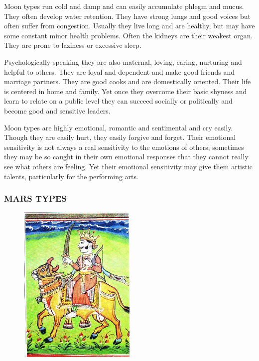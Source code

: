  

Moon types run cold and damp and can easily accumulate phlegm and mucus. They often develop water retention. They have strong lungs and good voices but often suffer from congestion. Usually they live long and are healthy, but may have some constant minor health problems. Often the kidneys are their weakest organ. They are prone to laziness or excessive sleep.

 

Psychologically speaking they are also maternal, loving, caring, nurturing and helpful to others. They are loyal and dependent and make good friends and marriage partners. They are good cooks and are domestically oriented. Their life is centered in home and family. Yet once they overcome their basic shyness and learn to relate on a public level they can succeed socially or politically and become good and sensitive leaders.

 

Moon types are highly emotional, romantic and sentimental and cry easily. Though they are easily hurt, they easily forgive and forget. Their emotional sensitivity is not always a real sensitivity to the emotions of others; sometimes they may be so caught in their own emotional responses that they cannot really see what others are feeling. Yet their emotional sensitivity may give them artistic talents, particularly for the performing arts.

 



\subsubsection{MARS TYPES}
 

 \begin{figure}[H]
 \centering
\includegraphics[width=0.5\textwidth]{pics/Mars_type.png}
 \end{figure}
 

